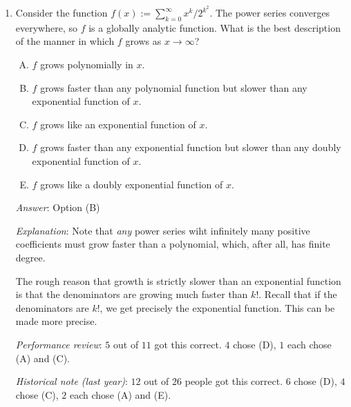 \documentclass[10pt]{amsart}
\begin{document}
\begin{enumerate}
  {\em Answer}: Option (D)

  {\em Explanation}: We use the fact that:

  $$k! \le (k!)^2 \le (2k)!$$

  for all $k \ge 0$, with both inequalities strict if $k \ge 2$.

  We thus get:

  $$\frac{x^k}{k!} \ge \frac{x^k}{(k!)^2} \ge \frac{x^k}{(2k)!}$$

  for $x > 0$, with both inequalities strict if $k \ge 2$. Summing up, we get:
  
  $$\sum_{k=0}^\infty \frac{x^k}{k!} > \sum_{k=0}^\infty \frac{x^k}{(k!)^2} > \sum_{k=0}^\infty \frac{x^k}{(2k)!}$$

  The left most expression is $e^x$. For the right most expression,
  put $u = \sqrt{x}$, and we get $\cosh u$, so $\cosh \sqrt{x}$. Thus
  option (D) is the right choice.

  {\em Performance review}: $1$ out of $11$ got this correct. $6$
  chose (C) and $4$ chose (B).

  {\em Historical note (last year)}: $12$ out of $26$ people got this
  correct. $5$ each chose (A) and (C), $3$ chose (B), and $1$ chose
  (E).
\item Consider the function $f(x) := \sum_{k=0}^\infty
  x^k/2^{k^2}$. The power series converges everywhere, so $f$ is a
  globally analytic function. What is the best description of the
  manner in which $f$ grows as $x \to \infty$?

  \begin{enumerate}[(A)]
  \item $f$ grows polynomially in $x$.
  \item $f$ grows faster than any polynomial function but slower than
    any exponential function of $x$.
  \item $f$ grows like an exponential function of $x$.
  \item $f$ grows faster than any exponential function but slower than
    any doubly exponential function of $x$.
  \item $f$ grows like a doubly exponential function of $x$.
  \end{enumerate}

  {\em Answer}: Option (B)

  {\em Explanation}: Note that {\em any} power series wiht infinitely
  many positive coefficients must grow faster than a polynomial,
  which, after all, has finite degree.

  The rough reason that growth is strictly slower than an exponential
  function is that the denominators are growing much faster than
  $k!$. Recall that if the denominators are $k!$, we get precisely the
  exponential function. This can be made more precise.

  {\em Performance review}: $5$ out of $11$ got this correct. $4$
  chose (D), $1$ each chose (A) and (C).

  {\em Historical note (last year)}: $12$ out of $26$ people got this
  correct. $6$ chose (D), $4$ chose (C), $2$ each chose (A) and (E).
\end{enumerate}
\end{document}
